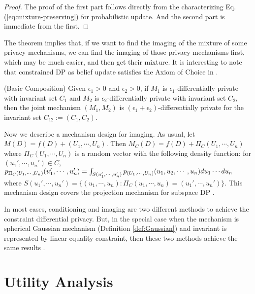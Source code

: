 \documentclass[11pt]{article}
\begin{document}
\begin{proof} The proof of the first part follows directly from the characterizing Eq. (\ref{eq:mixture-preserving}) for probabilistic update. And the second part is immediate from the first. 
\end{proof}

The theorem implies that, if we want to find the imaging of the mixture of some privacy mechanisms,  we can find the imaging of those privacy mechanisms first, which may be much easier,  and then get their mixture. It is interesting to note that constrained DP as belief update satisfies the Axiom of Choice in \cite{Kifer2010}.

\begin{lemma} (Basic Composition) \label{lem:composition-imaging} Given $\epsilon_1 > 0$ and $\epsilon_2 >0$, if $M_1$ is $\epsilon_1$-differentially private with invariant set $C_1$ and $M_2$ is $\epsilon_2$-differentially private with invariant set $C_2$, then the joint mechanism $(M_1, M_2)$ is $(\epsilon_1+ \epsilon_2)$-differentially private for the invariant set $C_{12}:= (C_1, C_2)$. 
\end{lemma}

Now we describe a mechanism design for imaging. As usual, let $M(D)= f(D) + (U_1, \cdots, U_n)$. Then $M_C(D) = f(D) + \Pi_C (U_1, \cdots, U_n)$ where $\Pi_C(U_1, \cdots, U_n)$ is a random vector with the following density function: for $(u_1', \cdots, u_n')\in C$, 
$p_{\Pi_C(U_1, \cdots, U_n)} (u_1', \cdots, u_n') = \int_{S(u_1',\cdots, u_n') } p_{(U_1, \cdots, U_n)} \\ (u_1, u_2, \cdots, u_n) du_1\cdots du_n$ where $S(u_1', \cdots, u_n') = \{(u_1, \cdots, u_n): \Pi_C(u_1, \cdots, u_n)= (u_1', \cdots, u_n')\}$.  This mechanism design covers the projection mechanism for subspace DP \cite{Gao2022subspace}.



In most cases, conditioning and imaging are two different methods to achieve the constraint differential privacy. But, in the special case when the mechanism is spherical Gaussian mechanism (Definition \ref{def:Gaussian}) and invariant is represented by linear-equality constraint, then these two methods achieve the same results \cite{Gao2022subspace}. 


\section{Utility Analysis}
\end{document}
